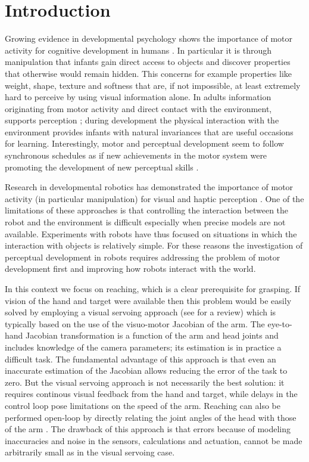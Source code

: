 \section{Introduction}
Growing evidence in developmental psychology shows the importance 
of motor activity for cognitive development in humans \cite{gallese06mirror}. 
In particular it is through manipulation that infants gain direct access to objects 
and discover properties that otherwise would remain hidden. 
This concerns for example properties like weight, shape, texture and 
softness that are, if not impossible, at least extremely hard to perceive 
by using visual information alone. In adults information originating 
from motor activity and direct contact with the environment, supports 
perception \cite{klatzky87hand}; during development
the physical interaction with the environment provides infants 
with natural invariances that are useful occasions for learning.
Interestingly, motor and perceptual development seem to follow synchronous  
schedules as if new achievements in the motor system were promoting
the development of new perceptual skills \cite{bushnell93motor}.

Research in developmental robotics has demonstrated the importance of
motor activity (in particular manipulation) for visual and haptic 
perception \cite{fitzpatrick07shared}. One of the 
limitations of these approaches is that controlling the interaction between
the robot and the environment is difficult especially when precise models are
not available. Experiments with robots have thus focused on situations
in which the interaction with objects is relatively simple. For these reasons
the investigation of perceptual development in robots requires addressing 
the problem of motor development first and improving how robots interact
with the world.

In this context we focus on reaching, which is a clear prerequisite for 
grasping. If vision of the hand and target were available then this problem 
would be easily solved by employing a visual servoing approach (see 
\cite{hutchinson96tutorial} for a review) which is typically based on 
the use of the visuo-motor Jacobian of the arm. The eye-to-hand Jacobian 
transformation is a function of the arm and head joints and includes knowledge 
of the camera parameters; its estimation is in practice a difficult task.
The fundamental advantage of this approach is that even an inaccurate 
estimation 
of the Jacobian allows reducing the error of the task to zero. But the visual 
servoing approach is not necessarily the best solution: it requires continous 
visual feedback from the hand and target, while delays in the control loop 
pose limitations on the speed of the arm.
Reaching can also be performed open-loop by directly relating the joint angles 
of the head with those of the arm 
\cite{blackburn94learning,metta99developmental}. 
The drawback of this approach is that errors because of modeling inaccuracies 
and noise in the sensors, calculations and actuation, cannot be made 
arbitrarily small as in the visual servoing case.

